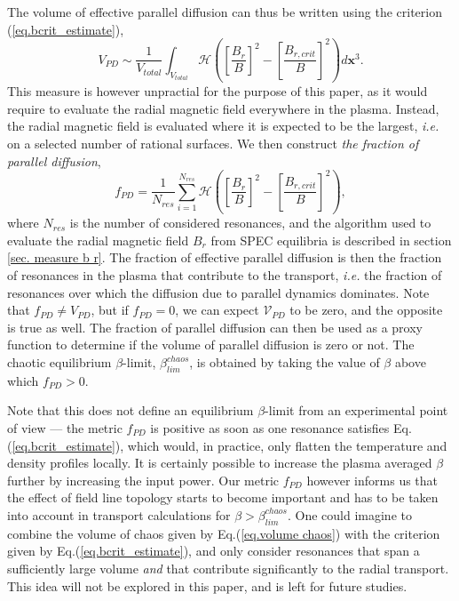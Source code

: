 \documentclass[my_thesis.tex]{subfiles}
\begin{document}
The volume of effective parallel diffusion can thus be written using the criterion (\ref{eq.bcrit_estimate}),
\begin{equation}
	V_{PD} \sim \frac{1}{V_{total}} \int_{V_{total}}\mathcal{H}\left(\left[\frac{ B_{r}}{B}\right]^2-\left[\frac{ B_{r,crit}}{B}\right]^2\right) d\mathbf{x}^3.
\end{equation}
This measure is however unpractial for the purpose of this paper, as it would require to evaluate the radial magnetic field everywhere in the plasma. Instead, the radial magnetic field is evaluated where it is expected to be the largest, \textit{i.e.} on a selected number of rational surfaces. We then construct \emph{the fraction of parallel diffusion},
\begin{equation}
	f_{PD} = \frac{1}{N_{res}}\sum_{i=1}^{N_{res}} \mathcal{H}\left(\left[\frac{B_{r}}{B}\right]^2-\left[\frac{B_{r,crit}}{B}\right]^2\right), \label{eq.def metric}
\end{equation}
where $N_{res}$ is the number of considered resonances, and the algorithm used to evaluate the radial magnetic field $B_r$ from SPEC equilibria is described in section \ref{sec. measure b r}. The fraction of effective parallel diffusion is then the fraction of resonances in the plasma that contribute to the transport, \textit{i.e.} the fraction of resonances over which the diffusion due to parallel dynamics dominates. Note that $f_{PD}\neq V_{PD}$, but if $f_{PD}=0$, we can expect $\mathcal{V}_{PD}$ to be zero, and the opposite is true as well. The fraction of parallel diffusion can then be used as a proxy function to determine if the volume of parallel diffusion is zero or not. The chaotic equilibrium $\beta$-limit, $\beta^{chaos}_{lim}$, is obtained by taking the value of $\beta$ above which $f_{PD}>0$. 

Note that this does not define an equilibrium $\beta$-limit from an experimental point of view --- the metric $f_{PD}$ is positive as soon as one resonance satisfies Eq.(\ref{eq.bcrit_estimate}), which would, in practice, only flatten the temperature and density profiles locally. It is certainly possible to increase the plasma averaged $\beta$ further by increasing the input power. Our metric $f_{PD}$ however informs us that the effect of field line topology starts to become important and has to be taken into account in transport calculations for $\beta>\beta^{chaos}_{lim}$. One could imagine to combine the volume of chaos given by Eq.(\ref{eq.volume chaos}) with the criterion given by Eq.(\ref{eq.bcrit_estimate}), and only consider resonances that span a sufficiently large volume \emph{and} that contribute significantly to the radial transport. This idea will not be explored in this paper, and is left for future studies.	
\end{document}
